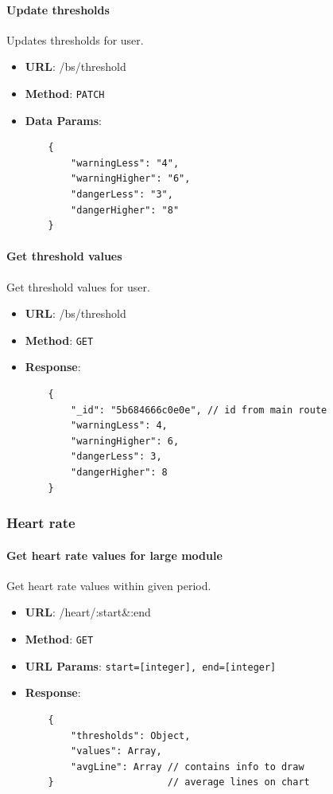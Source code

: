         \paragraph{Update thresholds} Updates thresholds for user.
        \begin{itemize}
            \item \textbf{URL}: /bs/threshold
            \item \textbf{Method}: \texttt{PATCH}
            \item \textbf{Data Params}: \begin{verbatim}
    {
        "warningLess": "4",
        "warningHigher": "6",
        "dangerLess": "3",
        "dangerHigher": "8"
    }  
            \end{verbatim}
        \end{itemize}

        \paragraph{Get threshold values} Get threshold values for user.
        \begin{itemize}
            \item \textbf{URL}: /bs/threshold
            \item \textbf{Method}: \texttt{GET}
            \item \textbf{Response}: \begin{verbatim}
    {
        "_id": "5b684666c0e0e", // id from main route
        "warningLess": 4,
        "warningHigher": 6,
        "dangerLess": 3,
        "dangerHigher": 8
    }
            \end{verbatim}
        \end{itemize}

    \subsubsection{Heart rate}

        \paragraph{Get heart rate values for large module} Get heart rate values within given period.
        \begin{itemize}
            \item \textbf{URL}: /heart/:start\&:end
            \item \textbf{Method}: \texttt{GET}
            \item \textbf{URL Params}: \texttt{start=[integer], end=[integer]}
            \item \textbf{Response}: \begin{verbatim}
    {
        "thresholds": Object,
        "values": Array,
        "avgLine": Array // contains info to draw 
    }                    // average lines on chart
            \end{verbatim}
        \end{itemize}

